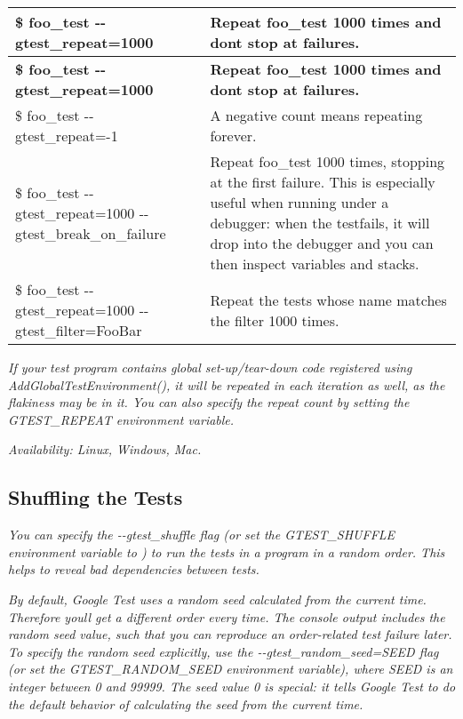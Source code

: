 {\itshape \tabulinesep=1mm
\begin{longtabu} spread 0pt [c]{*{2}{|X[-1]}|}
\hline
\rowcolor{\tableheadbgcolor}\textbf{ {\ttfamily \$ foo\+\_\+test -\/-\/gtest\+\_\+repeat=1000}  }&\textbf{ Repeat foo\+\_\+test 1000 times and don\textquotesingle{}t stop at failures.   }\\
\endfirsthead
\hline
\endfoot
\hline
\rowcolor{\tableheadbgcolor}\textbf{ {\ttfamily \$ foo\+\_\+test -\/-\/gtest\+\_\+repeat=1000}  }&\textbf{ Repeat foo\+\_\+test 1000 times and don\textquotesingle{}t stop at failures.   }\\
\endhead
{\ttfamily \$ foo\+\_\+test -\/-\/gtest\+\_\+repeat=-\/1}  &A negative count means repeating forever.   \\
{\ttfamily \$ foo\+\_\+test -\/-\/gtest\+\_\+repeat=1000 -\/-\/gtest\+\_\+break\+\_\+on\+\_\+failure}  &Repeat foo\+\_\+test 1000 times, stopping at the first failure. This is especially useful when running under a debugger\+: when the testfails, it will drop into the debugger and you can then inspect variables and stacks.   \\
{\ttfamily \$ foo\+\_\+test -\/-\/gtest\+\_\+repeat=1000 -\/-\/gtest\+\_\+filter=Foo\+Bar}  &Repeat the tests whose name matches the filter 1000 times.   \\
\end{longtabu}
}

{\itshape If your test program contains global set-\/up/tear-\/down code registered using {\ttfamily Add\+Global\+Test\+Environment()}, it will be repeated in each iteration as well, as the flakiness may be in it. You can also specify the repeat count by setting the {\ttfamily G\+T\+E\+S\+T\+\_\+\+R\+E\+P\+E\+AT} environment variable.}

{\itshape {\itshape Availability\+:} Linux, Windows, Mac.}

{\itshape \subsection*{Shuffling the Tests}}

{\itshape }

{\itshape You can specify the {\ttfamily -\/-\/gtest\+\_\+shuffle} flag (or set the {\ttfamily G\+T\+E\+S\+T\+\_\+\+S\+H\+U\+F\+F\+LE} environment variable to {}) to run the tests in a program in a random order. This helps to reveal bad dependencies between tests.}

{\itshape By default, Google Test uses a random seed calculated from the current time. Therefore you\textquotesingle{}ll get a different order every time. The console output includes the random seed value, such that you can reproduce an order-\/related test failure later. To specify the random seed explicitly, use the {\ttfamily -\/-\/gtest\+\_\+random\+\_\+seed=S\+E\+ED} flag (or set the {\ttfamily G\+T\+E\+S\+T\+\_\+\+R\+A\+N\+D\+O\+M\+\_\+\+S\+E\+ED} environment variable), where {\ttfamily S\+E\+ED} is an integer between 0 and 99999. The seed value 0 is special\+: it tells Google Test to do the default behavior of calculating the seed from the current time.}

